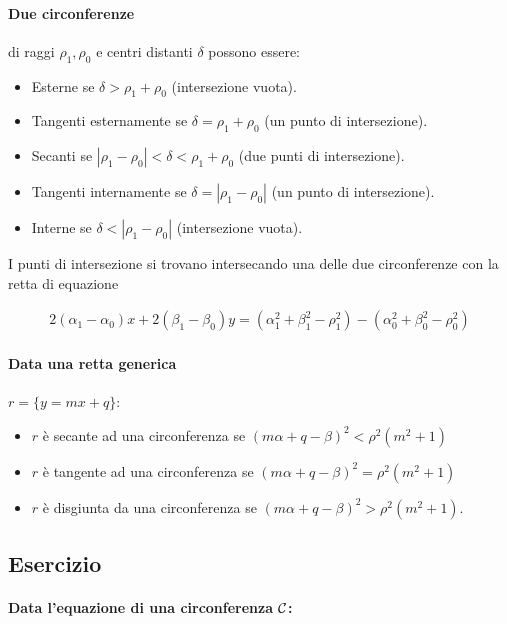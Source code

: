 \documentclass{article}
\begin{document}
\paragraph{Due circonferenze} di raggi $\rho_1, \rho_0$ e centri distanti $\delta$ possono essere:

\begin{itemize}
\item Esterne se $\delta > \rho_1 + \rho_0$ (intersezione vuota).
\item Tangenti esternamente se $\delta = \rho_1 + \rho_0$ (un punto di intersezione).
\item Secanti se $|\rho_1 - \rho_0| < \delta < \rho_1 + \rho_0$ (due punti di intersezione).
\item Tangenti internamente se $\delta = |\rho_1 - \rho_0|$ (un punto di intersezione).
\item Interne se $\delta < |\rho_1 - \rho_0|$ (intersezione vuota).
\end{itemize}

I punti di intersezione si trovano intersecando una delle due circonferenze con la retta di equazione

\begin{align*}
2 (\alpha_1 - \alpha_0) x + 2 (\beta_1 - \beta_0) y = (\alpha_1^2 + \beta_1^2 - \rho_1^2) - (\alpha_0^2 + \beta_0^2 - \rho_0^2)
\end{align*}

\paragraph{Data una retta generica} $r = \{y = m x + q\}$:

\begin{itemize}
\item $r$ è secante ad una circonferenza se $(m \alpha + q - \beta)^2 < \rho^2 (m^2 + 1)$
\item $r$ è tangente ad una circonferenza se $(m \alpha + q - \beta)^2 = \rho^2 (m^2 + 1)$
\item $r$ è disgiunta da una circonferenza se $(m \alpha + q - \beta)^2 > \rho^2 (m^2 + 1)$.
\end{itemize}

\subsection*{Esercizio}

\paragraph{Data l'equazione di una circonferenza $\cal C$:}
\end{document}
